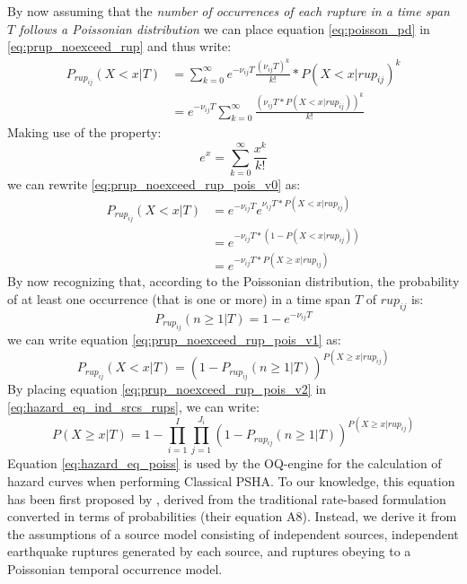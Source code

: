 By now assuming that the \textit{number of occurrences of each rupture in a time
span $T$ follows a Poissonian distribution} we can place equation
\ref{eq:poisson_pd} in \ref{eq:prup_noexceed_rup} and thus write:
\begin{align}
\label{eq:prup_noexceed_rup_pois_v0}
P_{rup_{ij}}(X < x | T) & = \sum_{k=0}^{\infty} e^{-\nu_{ij} T} \frac{(\nu_{ij} T) ^ {k}}{k!} * P(X < x | rup_{ij}) ^ {k} \nonumber \\
				 & =  e^{-\nu_{ij} T} \sum_{k=0}^{\infty} \frac{(\nu_{ij} T * P(X < x | rup_{ij})) ^ {k}}{k!}
\end{align}
Making use of the property:
\begin{equation}
e^{x} = \sum_{k=0} ^ {\infty} \frac{x^{k}}{k!}
\end{equation}
we can rewrite \ref{eq:prup_noexceed_rup_pois_v0} as:
\begin{align}
\label{eq:prup_noexceed_rup_pois_v1}
P_{rup_{ij}}(X < x | T) & = e^{-\nu_{ij} T} e ^ {\nu_{ij} T * P(X < x | rup_{ij})} \nonumber \\
				 & = e^{-\nu_{ij} T * (1 - P(X < x | rup_{ij}))} \nonumber \\
				 & = e^{-\nu_{ij} T * P(X \ge x | rup_{ij})}
\end{align}
By now recognizing that, according to the Poissonian distribution, the
probability of at least one occurrence (that is one or more) in a time span $T$
of $rup_{ij}$ is:
\begin{equation}
P_{rup_{ij}}(n \ge 1 | T) = 1 -  e^{-\nu_{ij} T}
\end{equation}
we can write equation \ref{eq:prup_noexceed_rup_pois_v1} as:
\begin{equation}
\label{eq:prup_noexceed_rup_pois_v2}
P_{rup_{ij}}(X < x | T) = (1 - P_{rup_{ij}}(n \ge 1 | T))^{P(X \ge x | rup_{ij})}
\end{equation}
By placing equation \ref{eq:prup_noexceed_rup_pois_v2} in \ref{eq:hazard_eq_ind_srcs_rups}, we can
write:
\begin{equation}
\label{eq:hazard_eq_poiss}
P(X \ge x | T) =  1 - \prod_{i=1}^{I} \prod_{j=1}^{J_{i}} (1 - P_{rup_{ij}}(n \ge 1 | T))^{P(X \ge x | rup_{ij})}
\end{equation}
Equation \ref{eq:hazard_eq_poiss} is used by the OQ-engine for the calculation
of hazard curves when performing Classical PSHA. To our knowledge, this equation
has been first proposed by \citet{field2003}, derived from the traditional
rate-based formulation converted in terms of probabilities (their equation
A8).  Instead, we derive it from the assumptions of a source model consisting of
independent sources, independent earthquake ruptures generated by each source,
and ruptures obeying to a Poissonian temporal occurrence model.

